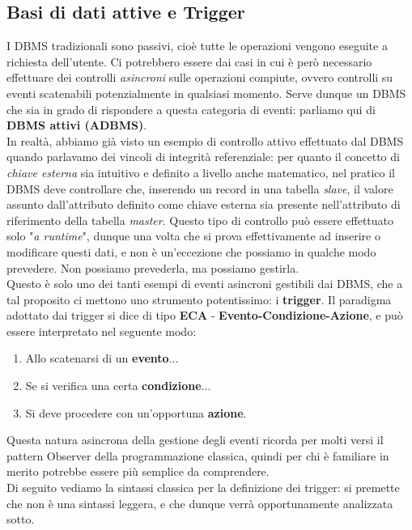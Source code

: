 \documentclass[12pt]{report}
\begin{document}
	\subsection{Basi di dati attive e Trigger}
	I DBMS tradizionali sono passivi, cioè tutte le operazioni vengono eseguite a richiesta dell'utente. Ci potrebbero essere dai casi in cui è però necessario effettuare dei controlli \textit{asincroni} sulle operazioni compiute, ovvero controlli su eventi scatenabili potenzialmente in qualsiasi momento. Serve dunque un DBMS che sia in grado di rispondere a questa categoria di eventi: parliamo qui di \textbf{DBMS attivi (ADBMS)}.\\
	In realtà, abbiamo già visto un esempio di controllo attivo effettuato dal DBMS quando parlavamo dei vincoli di integrità referenziale: per quanto il concetto di \textit{chiave esterna} sia intuitivo e definito a livello anche matematico, nel pratico il DBMS deve controllare che, inserendo un record in una tabella \textit{slave}, il valore assunto dall'attributo definito come chiave esterna sia presente nell'attributo di riferimento della tabella \textit{master}. Questo tipo di controllo può essere effettuato solo "\textit{a runtime}", dunque una volta che si prova effettivamente ad inserire o modificare questi dati, e non è un'eccezione che possiamo in qualche modo prevedere. Non possiamo prevederla, ma possiamo gestirla.\\
	Questo è solo uno dei tanti esempi di eventi asincroni gestibili dai DBMS, che a tal proposito ci mettono uno strumento potentissimo: i \textbf{trigger}. Il paradigma adottato dai trigger si dice di tipo \textbf{ECA} - \textbf{Evento-Condizione-Azione}, e può essere interpretato nel seguente modo:
	\begin{enumerate}
		\item Allo scatenarsi di un \textbf{evento}...
		
		\item Se si verifica una certa \textbf{condizione}...
		
		\item Si deve procedere con un'opportuna \textbf{azione}.
	\end{enumerate}
	Questa natura asincrona della gestione degli eventi ricorda per molti versi il pattern Observer della programmazione classica, quindi per chi è familiare in merito potrebbe essere più semplice da comprendere.\\
	Di seguito vediamo la sintassi classica per la definizione dei trigger: si premette che non è una sintassi leggera, e che dunque verrà opportunamente analizzata sotto.
\end{document}
